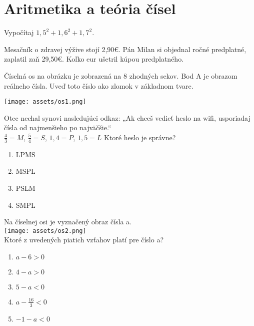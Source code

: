 \chapter{Aritmetika a teória čísel}

\begin{example}
	Vypočítaj $1,5^2 + 1,6^2 + 1,7^2$.
\end{example}

\begin{example}
	Mesačník o zdravej výžive stojí 2,90€. Pán Milan si objednal ročné predplatné, zaplatil zaň 29,50€. Koľko eur ušetril kúpou predplatného.
\end{example}

\begin{example}
	Číselná os na obrázku je zobrazená na 8 zhodných sekov. Bod A je obrazom reálneho čísla. Uveď toto číslo ako zlomok v základnom tvare.
	\begin{center}
		\texttt{[image: assets/os1.png]}
	\end{center}
\end{example}

\begin{example}
	Otec nechal synovi nasledujúci odkaz: „Ak chceš vedieť heslo na wifi, usporiadaj čísla od najmenšieho po najväčšie.“ \\
	$\frac{4}{3} = M$, $\frac{5}{4} = S$, $1,4 = P$, $1,5 = L$
	Ktoré heslo je správne?
	\begin{enumerate}
		\item LPMS
		\item MSPL
		\item PSLM
		\item SMPL
	\end{enumerate}
\end{example}

\begin{example}
	Na číselnej osi je vyznačený obraz čísla a. \\
	\texttt{[image: assets/os2.png]}\\
	Ktoré z uvedených piatich vzťahov platí pre číslo a?
	\begin{enumerate}
		\item $a - 6 > 0$
		\item $4 - a > 0$
		\item $5 - a < 0$
		\item $a - \frac{16}{3} < 0$
		\item $-1 - a < 0$
	\end{enumerate}
\end{example}

